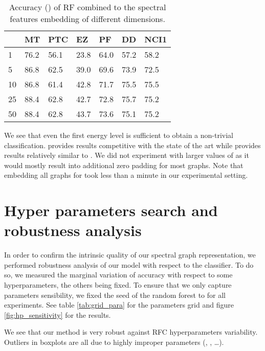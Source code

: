 \documentclass{article}
\begin{document}
\begin{table}[h]
  \begin{center}
  \renewcommand{\arraystretch}{1.2}
    \begin{tabular}[t]{l|M{1.2cm} M{1.2cm} M{1.2cm} M{1.2cm} M{1.2cm} M{1.2cm}}
                & MT   &     PTC       &      EZ       & PF      & DD      & NCI1 \\
      & 76.2 & 56.1 & 23.8 & 64.0 &  57.2   & 58.2 \\
      5  & 86.8 & 62.5 & 39.0 & 69.6 &  73.9   & 72.5 \\
      10 & 86.8 & 61.4 & 42.8 & 71.7 &  75.5   & 75.5 \\
      25 & 88.4 & 62.8 & 42.7 & 72.8 &  75.7   & 75.2 \\
      50 & 88.4 & 62.8 & 43.7 & 73.6 &  75.1   & 75.2 \\
      
      \end{tabular}
      \renewcommand{\arraystretch}{4}
  \end{center}
  \caption{Accuracy () of RF combined to the spectral features embedding of different dimensions.}
  \label{tab:k_results}
\end{table}

We see that even the first energy level is sufficient to obtain a non-trivial classification.  provides results competitive with the state of the art while  provides results relatively similar to . We did not experiment with larger values of  as it would mostly result into additional zero padding for most graphs. Note that embedding all graphs for  took less than a minute in our experimental setting.


\section{Hyper parameters search and robustness analysis}
\label{app:robustness}

In order to confirm the intrinsic quality of our spectral graph representation, we performed robustness analysis of our model with respect to the classifier. To do so, we measured the marginal variation of accuracy with respect to some hyperparameters, the others being fixed.
To ensure that we only capture parameters sensibility, we fixed the seed of the random forest to  for all experiments. See table \ref{tab:grid_para} for the parameters grid and figure \ref{fig:hp_sensitivity} for the results.

We see that our method is very robust against RFC hyperparameters variability. Outliers in boxplots are all due to highly improper parameters (, , \dots).
\end{document}

